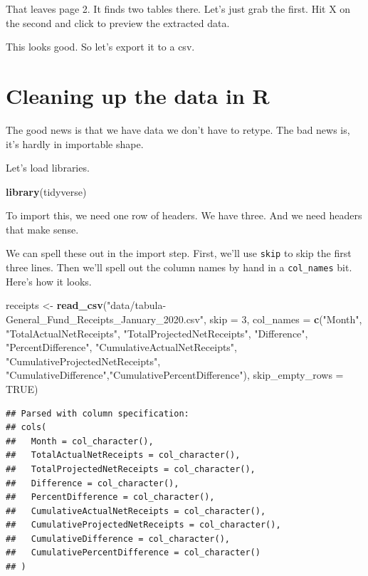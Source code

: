 \documentclass[]{book}
\newenvironment{Shaded}{\begin{snugshade}}{\end{snugshade}}
\newcommand{\DataTypeTok}[1]{\textcolor[rgb]{0.13,0.29,0.53}{#1}}
\newcommand{\DecValTok}[1]{\textcolor[rgb]{0.00,0.00,0.81}{#1}}
\newcommand{\KeywordTok}[1]{\textcolor[rgb]{0.13,0.29,0.53}{\textbf{#1}}}
\newcommand{\NormalTok}[1]{#1}
\newcommand{\OtherTok}[1]{\textcolor[rgb]{0.56,0.35,0.01}{#1}}
\newcommand{\StringTok}[1]{\textcolor[rgb]{0.31,0.60,0.02}{#1}}
\begin{document}
That leaves page 2. It finds two tables there. Let's just grab the first. Hit X on the second and click to preview the extracted data.

This looks good. So let's export it to a csv.

\hypertarget{cleaning-up-the-data-in-r}{%
\section{Cleaning up the data in R}\label{cleaning-up-the-data-in-r}}

The good news is that we have data we don't have to retype. The bad news is, it's hardly in importable shape.

Let's load libraries.

\begin{Shaded}
\begin{Highlighting}[]
\KeywordTok{library}\NormalTok{(tidyverse)}
\end{Highlighting}
\end{Shaded}

To import this, we need one row of headers. We have three. And we need headers that make sense.

We can spell these out in the import step. First, we'll use \texttt{skip} to skip the first three lines. Then we'll spell out the column names by hand in a \texttt{col\_names} bit. Here's how it looks.

\begin{Shaded}
\begin{Highlighting}[]
\NormalTok{receipts <-}\StringTok{ }\KeywordTok{read_csv}\NormalTok{(}\StringTok{"data/tabula-General_Fund_Receipts_January_2020.csv"}\NormalTok{, }\DataTypeTok{skip =} \DecValTok{3}\NormalTok{, }\DataTypeTok{col_names =} \KeywordTok{c}\NormalTok{(}\StringTok{"Month"}\NormalTok{, }\StringTok{"TotalActualNetReceipts"}\NormalTok{, }\StringTok{"TotalProjectedNetReceipts"}\NormalTok{, }\StringTok{"Difference"}\NormalTok{, }\StringTok{"PercentDifference"}\NormalTok{, }\StringTok{"CumulativeActualNetReceipts"}\NormalTok{, }\StringTok{"CumulativeProjectedNetReceipts"}\NormalTok{, }\StringTok{"CumulativeDifference"}\NormalTok{,}\StringTok{"CumulativePercentDifference"}\NormalTok{), }\DataTypeTok{skip_empty_rows =} \OtherTok{TRUE}\NormalTok{)}
\end{Highlighting}
\end{Shaded}

\begin{verbatim}
## Parsed with column specification:
## cols(
##   Month = col_character(),
##   TotalActualNetReceipts = col_character(),
##   TotalProjectedNetReceipts = col_character(),
##   Difference = col_character(),
##   PercentDifference = col_character(),
##   CumulativeActualNetReceipts = col_character(),
##   CumulativeProjectedNetReceipts = col_character(),
##   CumulativeDifference = col_character(),
##   CumulativePercentDifference = col_character()
## )
\end{verbatim}
\end{document}
